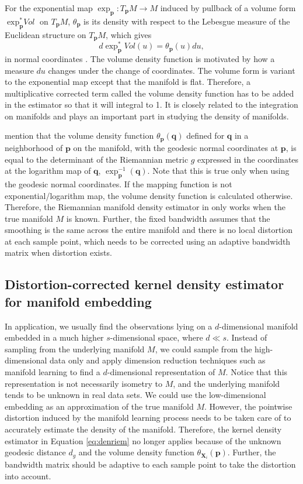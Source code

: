 \documentclass[11pt,a4paper,]{article}
\begin{document}
For the exponential map \(\exp_{\pmb{p}}: T_{\pmb{p}}M \rightarrow M\) induced by pullback of a volume form \(\exp_{\pmb{p}}^*\textit{Vol}\) on \(T_{\pmb{p}}M\), \(\theta_{\pmb{p}}\) is its density with respect to the Lebesgue measure of the Euclidean structure on \(T_{\pmb{p}}M\), which gives
\[
d\exp_{\pmb{p}}^*\textit{Vo}l(u) = \theta_{\pmb{p}}(u)du,
\]
in normal coordinates \autocite{Le_Brigant2019-lj}. The volume density function is motivated by how a measure \(du\) changes under the change of coordinates. The volume form is variant to the exponential map except that the manifold is flat. Therefore, a multiplicative corrected term called the volume density function has to be added in the estimator so that it will integral to 1. It is closely related to the integration on manifolds and plays an important part in studying the density of manifolds.

\textcite{Pelletier2005-vu} mention that the volume density function \(\theta_{\pmb{p}}(\pmb{q})\) defined for \(\pmb{q}\) in a neighborhood of \(\pmb{p}\) on the manifold, with the geodesic normal coordinates at \(\pmb{p}\), is equal to the determinant of the Riemannian metric \(g\) expressed in the coordinates at the logarithm map of \(\pmb{q}\), \(\exp_{\pmb{p}}^{-1}(\pmb{q})\).
Note that this is true only when using the geodesic normal coordinates. If the mapping function is not exponential/logarithm map, the volume density function is calculated otherwise. Therefore, the Riemannian manifold density estimator in \textcite{Pelletier2005-vu} only works when the true manifold \(M\) is known.
Further, the fixed bandwidth assumes that the smoothing is the same across the entire manifold and there is no local distortion at each sample point, which needs to be corrected using an adaptive bandwidth matrix when distortion exists.

\hypertarget{dckde}{%
\subsection{Distortion-corrected kernel density estimator for manifold embedding}\label{dckde}}

In application, we usually find the observations lying on a \(d\)-dimensional manifold embedded in a much higher \(s\)-dimensional space, where \(d \ll s\). Instead of sampling from the underlying manifold \(M\), we could sample from the high-dimensional data only and apply dimension reduction techniques such as manifold learning to find a \(d\)-dimensional representation of \(M\).
Notice that this representation is not necessarily isometry to \(M\), and the underlying manifold tends to be unknown in real data sets. We could use the low-dimensional embedding as an approximation of the true manifold \(M\). However, the pointwise distortion induced by the manifold learning process needs to be taken care of to accurately estimate the density of the manifold. Therefore, the kernel density estimator in Equation \eqref{eq:denriem} no longer applies because of the unknown geodesic distance \(d_g\) and the volume density function \(\theta_{\pmb{X}_i}(\pmb{p})\).
Further, the bandwidth matrix should be adaptive to each sample point to take the distortion into account.
\end{document}
